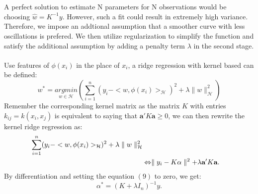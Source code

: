 \\ \\
A perfect solution to estimate N parameters for N observations would be choosing $\hat{w}=K^{-1}y$. However, such a fit could result in extremely high variance. Therefore, we impose an addtional assumption 
that a smoother curve with less oscillations is prefered. We then utilize regularization to simplify the function and satisfy the additional assumption by adding a penalty term $\lambda$ in 
the second stage. 
\\ \\
Use features of $\phi(x_i)$ in the place of $x_i$, a ridge regression with kernel based can be defined:
\begin{equation}
    w^*=\underset{w\in\mathcal{H}}{argmin}\left(\sum_{i=1}^n(y_i-<w,\phi(x_i)>_\mathcal{H})^2+\lambda\parallel w\parallel_\mathcal{H}^2\right)
\end{equation}
Remember the corresponding kernel matrix as the matrix $K$ with entries $k_{ij}=k(x_i,x_j)$ is equivalent to saying that $\textbf{a}'K \textbf{a}\geq 0$, we can then rewrite the kernel ridge regression as:
\begin{align}
    \sum_{i=1}^n(y_i-<w,\phi(x_i)>_\mathcal{H})^2+\lambda\parallel w\parallel_\mathcal{H}^2 \notag\\
    &\Leftrightarrow\parallel y_i-K \alpha\parallel^2+\lambda \textbf{a}' K\textbf{a}.
\end{align}
By differentiation and setting the equation $(9)$ to zero, we get:
\begin{equation}
    \alpha^{*}=(K+\lambda I_n)^{-1}y.
\end{equation}